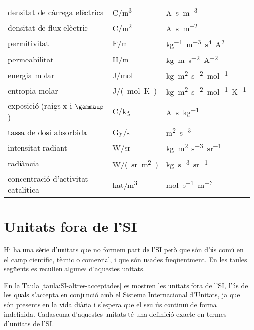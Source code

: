 \begin{longtable}[h]{lll}
   densitat de càrrega elèctrica & \si{C/m^3} & \si{A.s.m^{-3}} \\
   densitat de flux elèctric & \si{C/m^2} & \si{A.s.m^{-2}}\\
   permitivitat &  \si{F/m}& \si{kg^{-1}.m^{-3}.s^4.A^2} \\
   permeabilitat &  \si{H/m} & \si{kg.m.s^{-2}.A^{-2}} \\
   energia molar & \si{J/mol} & \si{kg.m^2.s^{-2}.mol^{-1}} \\
   entropia molar& \si{J/(mol.K)} & \si{kg.m^2.s^{-2}.mol^{-1}.K^{-1}} \\
   exposició (raigs x i $\gammaup$) & \si{C/kg} & \si{A.s.kg^{-1}} \\
   tassa de dosi absorbida & \si{Gy/s} & \si{m^2.s^{-3}}\\
   intensitat radiant & \si{W/sr} & \si{kg.m^2.s^{-3}.sr^{-1}} \\
   radiància & \si{W/(sr.m^2)} & \si{kg.s^{-3}.sr^{-1}} \\
   concentració d'activitat catalítica &  \si{kat/m^3} & \si{mol.s^{-1}.m^{-3}}\\
    \bottomrule[1pt]
\end{longtable}



\section{Unitats fora de l'SI}\label{sec:unitats-fora-SI}

Hi ha una sèrie d'unitats que no formem part de l'SI però que són d'ús comú en el camp científic, tècnic o comercial, i que són usades freqüentment. En les taules següents es recullen algunes d'aquestes unitats.

En la Taula \vref{taula:SI-altres-acceptades} es mostren les unitats fora de l'SI, l'ús de les quals s'accepta en conjunció amb el Sistema Internacional d'Unitats, ja que són presents en la vida diària i s'espera que el seu ús continuï de forma indefinida. Cadascuna d'aquestes unitats té una definició exacte en termes d'unitats de l'SI.


